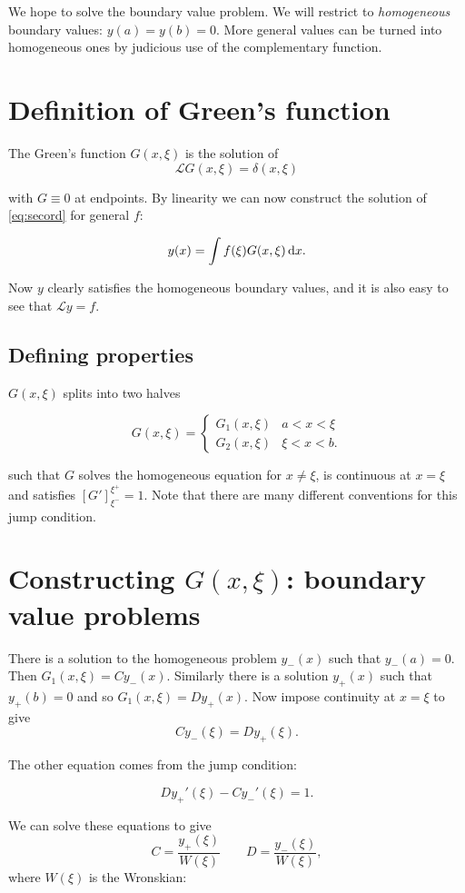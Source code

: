 \documentclass{notes}
\theoremstyle{plain}
\newcommand{\cL}{\mathcal{L}}
\begin{document}
We hope to solve the boundary value problem.  We will restrict to
\emph{homogeneous} boundary values: $y(a) = y(b) = 0$.  More
general values can be turned into homogeneous ones by judicious use
of the complementary function.

\section{Definition of Green's function}

The Green's function $G(x,\xi)$ is the solution of
\[
\cL G(x,\xi) = \delta(x,\xi)
\]

with $G \equiv 0$ at endpoints.  By linearity we can now construct the
solution of \eqref{eq:secord} for general $f$:

\[
y(x) = \int f(\xi) G(x,\xi)\, \mathrm{d} x.
\]

Now $y$ clearly satisfies the homogeneous boundary values, and it
is also easy to see that $\cL y = f$.

\subsection{Defining properties}

$G(x,\xi)$ splits into two halves

\[
G(x,\xi) = \begin{cases}
G_1(x,\xi) & a < x < \xi \\
G_2(x,\xi) & \xi < x < b.
\end{cases}
\]

such that $G$ solves the homogeneous equation for $x \neq \xi$, is
continuous at $x=\xi$ and satisfies $\left[G' \right]_{\xi^-}^{\xi^+}
= 1$.  Note that there are many different conventions for this jump
condition.

\section{Constructing $G(x,\xi)$: boundary value problems}

There is a solution to the homogeneous problem $y_-(x)$ such that
$y_-(a) = 0$.  Then $G_1(x,\xi) = C y_-(x)$.  Similarly there is a
solution $y_+(x)$ such that $y_+(b) = 0$ and so $G_1(x,\xi) = D y_+(x)$.
Now impose continuity at $x=\xi$ to give
\[
C y_-(\xi) = D y_+(\xi).
\]

The other equation comes from the jump condition:

\[
D y_+'(\xi) - C y_-'(\xi) = 1.
\]


We can solve these equations to give
\[
C = \frac{y_+(\xi)}{W(\xi)} \qquad D = \frac{y_-(\xi)}{W(\xi)},
\]
where $W(\xi)$ is the Wronskian:
\end{document}
